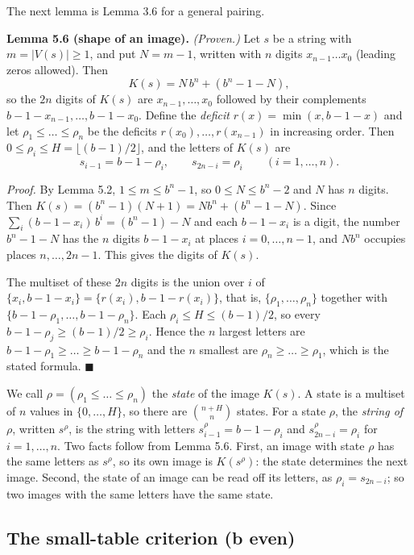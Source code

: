 \documentclass[11pt,letterpaper]{article}
\theoremstyle{paperstyle}
\theoremstyle{paperstyledef}
\theoremstyle{paperstylerem}
\begin{document}
The next lemma is Lemma 3.6 for a general pairing.

\textbf{Lemma 5.6 (shape of an image).} \emph{(Proven.)} Let \(s\) be a string with \(m = |V(s)| \ge 1\), and put \(N = m - 1\), written with \(n\) digits \(x_{n-1} \dots x_0\) (leading zeros allowed). Then \[K(s) = N\, b^n + (b^n - 1 - N),\] so the \(2n\) digits of \(K(s)\) are \(x_{n-1}, \dots, x_0\) followed by their complements \(b-1-x_{n-1}, \dots, b-1-x_0\). Define the \emph{deficit} \(r(x) = \min(x, b-1-x)\) and let \(\rho_1 \le \dots \le \rho_n\) be the deficits \(r(x_0), \dots, r(x_{n-1})\) in increasing order. Then \(0 \le \rho_i \le H = \lfloor (b-1)/2 \rfloor\), and the letters of \(K(s)\) are \[s_{i-1} = b - 1 - \rho_i, \qquad s_{2n-i} = \rho_i \qquad (i = 1, \dots, n).\]

\emph{Proof.} By Lemma 5.2, \(1 \le m \le b^n - 1\), so \(0 \le N \le b^n - 2\) and \(N\) has \(n\) digits. Then \(K(s) = (b^n - 1)(N + 1) = N b^n + (b^n - 1 - N)\). Since \(\sum_i (b-1-x_i)\, b^i = (b^n - 1) - N\) and each \(b-1-x_i\) is a digit, the number \(b^n - 1 - N\) has the \(n\) digits \(b-1-x_i\) at places \(i = 0, \dots, n-1\), and \(N b^n\) occupies places \(n, \dots, 2n-1\). This gives the digits of \(K(s)\).

The multiset of these \(2n\) digits is the union over \(i\) of \(\{x_i, b-1-x_i\} = \{r(x_i), b-1-r(x_i)\}\), that is, \(\{\rho_1, \dots, \rho_n\}\) together with \(\{b-1-\rho_1, \dots, b-1-\rho_n\}\). Each \(\rho_i \le H \le (b-1)/2\), so every \(b - 1 - \rho_j \ge (b-1)/2 \ge \rho_i\). Hence the \(n\) largest letters are \(b-1-\rho_1 \ge \dots \ge b-1-\rho_n\) and the \(n\) smallest are \(\rho_n \ge \dots \ge \rho_1\), which is the stated formula. \(\blacksquare\)

We call \(\rho = (\rho_1 \le \dots \le \rho_n)\) the \emph{state} of the image \(K(s)\). A state is a multiset of \(n\) values in \(\{0, \dots, H\}\), so there are \(\binom{n+H}{n}\) states. For a state \(\rho\), the \emph{string of \(\rho\)}, written \(s^\rho\), is the string with letters \(s^\rho_{i-1} = b-1-\rho_i\) and \(s^\rho_{2n-i} = \rho_i\) for \(i = 1, \dots, n\). Two facts follow from Lemma 5.6. First, an image with state \(\rho\) has the same letters as \(s^\rho\), so its own image is \(K(s^\rho)\): the state determines the next image. Second, the state of an image can be read off its letters, as \(\rho_i = s_{2n-i}\); so two images with the same letters have the same state.

\subsection{The small-table criterion (b even)}\label{the-small-table-criterion-b-even}
\end{document}
